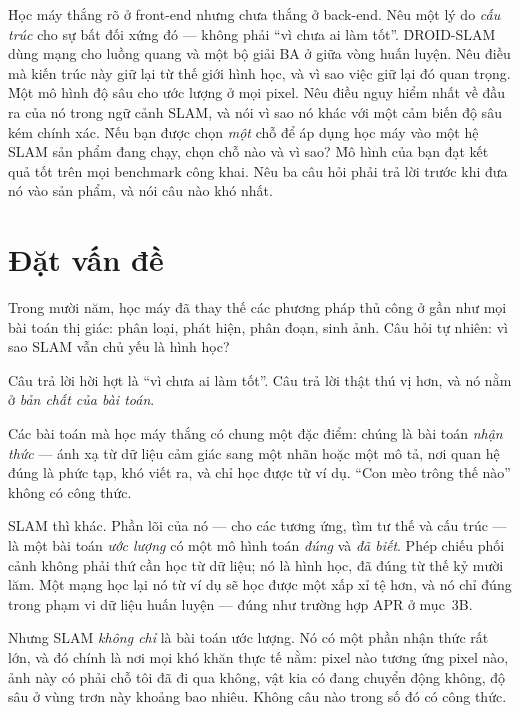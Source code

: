 \documentclass[../../vslam.tex]{subfiles}
\begin{document}
\begin{khoigoi}
\h{Học máy thắng rõ ở front-end nhưng chưa thắng ở back-end. Nêu một lý do \emph{cấu trúc} cho sự bất đối xứng đó --- không phải ``vì chưa ai làm tốt''.}
\h{DROID-SLAM dùng mạng cho luồng quang và một bộ giải BA ở giữa vòng huấn luyện. Nêu điều mà kiến trúc này giữ lại từ thế giới hình học, và vì sao việc giữ lại đó quan trọng.}
\h{Một mô hình độ sâu cho ước lượng ở mọi pixel. Nêu điều nguy hiểm nhất về đầu ra của nó trong ngữ cảnh SLAM, và nói vì sao nó khác với một cảm biến độ sâu kém chính xác.}
\h{Nếu bạn được chọn \emph{một} chỗ để áp dụng học máy vào một hệ SLAM sản phẩm đang chạy, chọn chỗ nào và vì sao?}
\h{Mô hình của bạn đạt kết quả tốt trên mọi benchmark công khai. Nêu ba câu hỏi phải trả lời trước khi đưa nó vào sản phẩm, và nói câu nào khó nhất.}
\end{khoigoi}

\section{Đặt vấn đề}

Trong mười năm, học máy đã thay thế các phương pháp thủ công ở gần như mọi bài toán thị giác: phân loại, phát hiện, phân đoạn, sinh ảnh. Câu hỏi tự nhiên: vì sao SLAM vẫn chủ yếu là hình học?

Câu trả lời hời hợt là ``vì chưa ai làm tốt''. Câu trả lời thật thú vị hơn, và nó nằm ở \emph{bản chất của bài toán}.

Các bài toán mà học máy thắng có chung một đặc điểm: chúng là bài toán \emph{nhận thức} --- ánh xạ từ dữ liệu cảm giác sang một nhãn hoặc một mô tả, nơi quan hệ đúng là phức tạp, khó viết ra, và chỉ học được từ ví dụ. ``Con mèo trông thế nào'' không có công thức.

SLAM thì khác. Phần lõi của nó --- cho các tương ứng, tìm tư thế và cấu trúc --- là một bài toán \emph{ước lượng} có một mô hình toán \emph{đúng} và \emph{đã biết}. Phép chiếu phối cảnh không phải thứ cần học từ dữ liệu; nó là hình học, đã đúng từ thế kỷ mười lăm. Một mạng học lại nó từ ví dụ sẽ học được một xấp xỉ tệ hơn, và nó chỉ đúng trong phạm vi dữ liệu huấn luyện --- đúng như trường hợp APR ở  mục~3B.

Nhưng SLAM \emph{không chỉ} là bài toán ước lượng. Nó có một phần nhận thức rất lớn, và đó chính là nơi mọi khó khăn thực tế nằm: pixel nào tương ứng pixel nào, ảnh này có phải chỗ tôi đã đi qua không, vật kia có đang chuyển động không, độ sâu ở vùng trơn này khoảng bao nhiêu. Không câu nào trong số đó có công thức.
\end{document}
